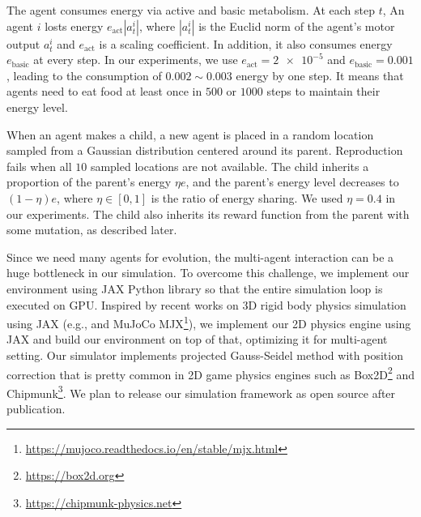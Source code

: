 The agent consumes energy via active and basic metabolism. At each step $t$, An agent $i$ losts energy $e_{\mathrm{act}} |a_{t}^{i}|$, where $|a_{t}^{i}|$ is the Euclid norm of the agent's motor output $a_{t}^{i}$ and $e_{\mathrm{act}}$ is a scaling coefficient. In addition, it also consumes energy $e_{\mathrm{basic}}$ at every step. In our experiments, we use $e_{\mathrm{act}} = \num{2e-5}$ and $e_{\mathrm{basic}} = 0.001$, leading to the consumption of $0.002 \sim 0.003$ energy by one step. It means that agents need to eat food at least once in $500$ or $1000$ steps to maintain their energy level.

When an agent makes a child, a new agent is placed in a random location sampled from a Gaussian distribution centered around its parent. Reproduction fails when all $10$ sampled locations are not available. The child inherits a proportion of the parent's energy $\eta e$, and the parent's energy level decreases to $(1-\eta)e$, where $\eta \in [0, 1]$ is the ratio of energy sharing. We used $\eta = 0.4$ in our experiments. The child also inherits its reward function from the parent with some mutation, as described later.

Since we need many agents for evolution, the multi-agent interaction can be a huge bottleneck in our simulation. To overcome this challenge, we implement our environment using JAX Python library \citep{jax2018github} so that the entire simulation loop is executed on GPU. Inspired by recent works on 3D rigid body physics simulation using JAX (e.g., \citet{brax2021github} and MuJoCo \citep{todorov2012mujoco} MJX\footnote{\url{https://mujoco.readthedocs.io/en/stable/mjx.html}}), we implement our 2D physics engine using JAX and build our environment on top of that, optimizing it for multi-agent setting. Our simulator implements projected Gauss-Seidel method with position correction \citep{catto2005iterative} that is pretty common in 2D game physics engines such as Box2D\footnote{\url{https://box2d.org}} and Chipmunk\footnote{\url{https://chipmunk-physics.net}}. We plan to release our simulation framework as open source after publication.

